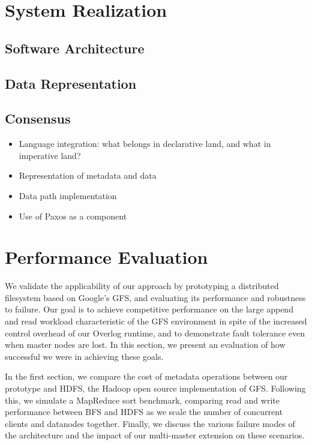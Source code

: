 \documentclass{article}
\begin{document}
\section{System Realization}
\label{system-realize}

\subsection{Software Architecture}

\subsection{Data Representation}

\subsection{Consensus}

\begin{itemize}
\item
  Language integration: what belongs in declarative land, and what in
  imperative land?

\item
  Representation of metadata and data

\item
  Data path implementation

\item
  Use of Paxos as a component
\end{itemize}

\section{Performance Evaluation}
\label{perf-eval}
We validate the applicability of our approach by prototyping a
distributed filesystem based on Google's GFS, and evaluating its
performance and robustness to failure.  Our goal is to achieve
competitive performance on the large append and read workload
characteristic of the GFS environment in spite of the increased
control overhead of our Overlog runtime, and to demonstrate fault
tolerance even when master nodes are lost.  In this section, we
present an evaluation of how successful we were in achieving these
goals.

In the first section, we compare the cost of metadata operations
between our prototype and HDFS, the Hadoop open source implementation
of GFS.  Following this, we simulate a MapReduce sort benchmark,
comparing read and write performance between BFS and HDFS as we scale
the number of concurrent clients and datanodes together.  Finally, we
discuss the various failure modes of the architecture and the impact
of our multi-master extension on these scenarios.
\end{document}
